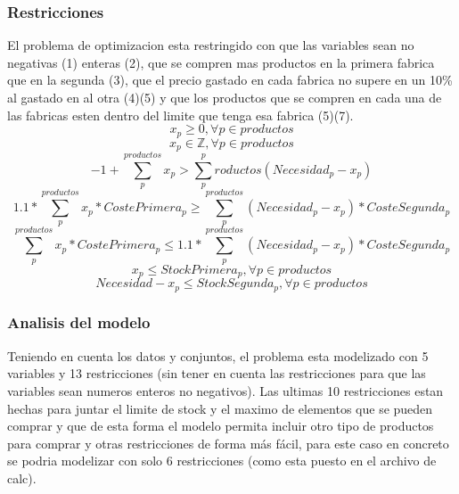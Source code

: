 \documentclass[11pt,spanish]{article}
\begin{document}
			\subsubsection{Restricciones}
			El problema de optimizacion esta restringido con que las variables sean no negativas (1) enteras (2), que se compren mas productos en la primera fabrica que en la segunda (3), que el precio gastado en cada fabrica no supere en un 10\% al gastado en al otra (4)(5) y que los productos que se compren en cada una de las fabricas esten dentro del limite que tenga esa fabrica (5)(7).
			\begin{equation}
			x_p \geq 0, \forall p \in productos
			\end{equation}
			\begin{equation}
			x_p \in \mathbb{Z} , \forall p \in productos
			\end{equation}
			\begin{equation}
			-1 + \sum_p^{productos} x_p > \sum_p^productos (Necesidad_p - x_p)
			\end{equation}
			\begin{equation}
			1.1*\sum_p^{productos} x_p*CostePrimera_p \geq \sum_p^{productos} (Necesidad_p - x_p)*CosteSegunda_p
			\end{equation}
			\begin{equation}
			\sum_p^{productos} x_p*CostePrimera_p \leq 1.1*\sum_p^{productos} (Necesidad_p - x_p)*CosteSegunda_p
			\end{equation}
			\begin{equation}
			x_p \leq StockPrimera_p, \forall p \in productos
			\end{equation}
			\begin{equation}
			Necesidad - x_p \leq StockSegunda_p, \forall p \in productos
			\end{equation}
			\subsubsection{Analisis del modelo}
			Teniendo en cuenta los datos y conjuntos, el problema esta modelizado con 5 variables y 13 restricciones (sin tener en cuenta las restricciones para que las variables sean numeros enteros no negativos). Las ultimas 10 restricciones estan hechas para juntar el limite de stock y el maximo de elementos que se pueden comprar y que de esta forma el modelo permita incluir otro tipo de productos para comprar y otras restricciones de forma más fácil, para este caso en concreto se podria modelizar con solo 6 restricciones (como esta puesto en el archivo de calc).
\end{document}
